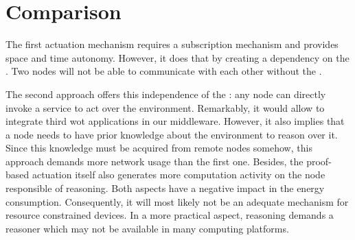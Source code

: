 
\section{Comparison}

The first actuation mechanism requires a subscription mechanism and provides space and time autonomy.
However, it does that by creating a dependency on the \space{}.
Two nodes will not be able to communicate with each other without the \space{}.


The second approach offers this independence of the \space{}: any node can directly invoke a service to act over the environment.
Remarkably, it would allow to integrate third \ac{wot} applications in our middleware.
However, it also implies that a node needs to have prior knowledge about the environment to reason over it.
Since this knowledge must be acquired from remote nodes somehow, this approach demands more network usage than the first one.
Besides, the proof-based actuation itself also generates more computation activity on the node responsible of reasoning.
Both aspects have a negative impact in the energy consumption.
Consequently, it will most likely not be an adequate mechanism for resource constrained devices.
In a more practical aspect, reasoning demands a reasoner which may not be available in many computing platforms. %




